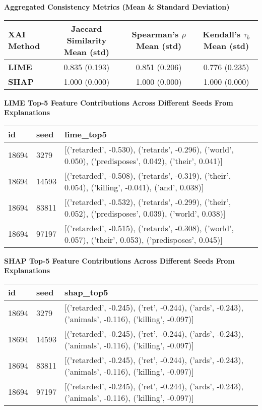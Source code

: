 \documentclass{article}
\begin{document}
\begin{table}[ht]
\centering
\textbf{Aggregated Consistency Metrics (Mean \& Standard Deviation)}\\[0.5em]
\begin{tabular}{lccc}
\toprule
\textbf{XAI Method} & \textbf{Jaccard Similarity Mean (std)} & \textbf{Spearman's $\rho$ Mean (std)} & \textbf{Kendall's $\tau_b$ Mean (std)} \\
\midrule
\textbf{LIME} & 0.835 (0.193) & 0.851 (0.206) & 0.776 (0.235) \\
\textbf{SHAP} & 1.000 (0.000) & 1.000 (0.000) & 1.000 (0.000) \\
\bottomrule
\end{tabular}
\end{table}

\begin{table}[ht]
\centering
\textbf{LIME Top-5 Feature Contributions Across Different Seeds From Explanations}\\[0.5em]
\begin{tabular}{llp{10cm}}
\toprule
\textbf{id} & \textbf{seed} & \textbf{lime\_top5} \\
\midrule
18694 & 3279  & [('retarded', -0.530), ('retards', -0.296), ('world', 0.050), ('predisposes', 0.042), ('their', 0.041)] \\
18694 & 14593 & [('retarded', -0.508), ('retards', -0.319), ('their', 0.054), ('killing', -0.041), ('and', 0.038)] \\
18694 & 83811 & [('retarded', -0.532), ('retards', -0.299), ('their', 0.052), ('predisposes', 0.039), ('world', 0.038)] \\
18694 & 97197 & [('retarded', -0.515), ('retards', -0.308), ('world', 0.057), ('their', 0.053), ('predisposes', 0.045)] \\
\bottomrule
\end{tabular}
\end{table}

\begin{table}[ht]
\centering
\textbf{SHAP Top-5 Feature Contributions Across Different Seeds From Explanations}\\[0.5em]
\begin{tabular}{llp{11cm}}
\toprule
\textbf{id} & \textbf{seed} & \textbf{shap\_top5} \\
\midrule
18694 & 3279  & [('retarded', -0.245), ('ret', -0.244), ('ards', -0.243), ('animals', -0.116), ('killing', -0.097)] \\
18694 & 14593 & [('retarded', -0.245), ('ret', -0.244), ('ards', -0.243), ('animals', -0.116), ('killing', -0.097)] \\
18694 & 83811 & [('retarded', -0.245), ('ret', -0.244), ('ards', -0.243), ('animals', -0.116), ('killing', -0.097)] \\
18694 & 97197 & [('retarded', -0.245), ('ret', -0.244), ('ards', -0.243), ('animals', -0.116), ('killing', -0.097)] \\
\bottomrule
\end{tabular}
\end{table}
\end{document}
